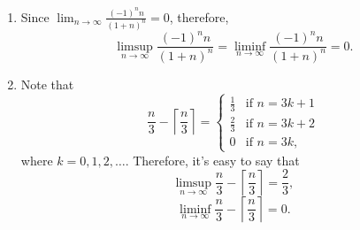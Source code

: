 \documentclass[a4paper]{article}
\theoremstyle{plain}
\begin{document}
\begin{enumerate}[label = (\alph*)]
    \item Since $\lim_{n\to\infty}\frac{(-1)^n n}{(1+n)^n} = 0$,
        therefore,
        \[
            \limsup_{n\to\infty}\frac{(-1)^n n}{(1+n)^n} = 
            \liminf_{n\to\infty}\frac{(-1)^n n}{(1+n)^n} = 0.
        \]

    \item Note that 
        \[
            \frac{n}{3} - \left\lceil\frac{n}{3}\right\rceil = \begin{cases}
                \frac{1}{3} & \text{if } n = 3k+1 \\
                \frac{2}{3} & \text{if } n = 3k+2 \\
                0 & \text{if } n = 3k,
            \end{cases}
        \]
        where $k = 0,1,2,\dots$. Therefore, it's easy to say that
        \[
            \limsup_{n\to\infty}\frac{n}{3} - \left\lceil\frac{n}{3}\right\rceil = \frac{2}{3},
        \]
        \[
            \liminf_{n\to\infty}\frac{n}{3} - \left\lceil\frac{n}{3}\right\rceil = 0.
        \]
\end{enumerate}
\end{document}
